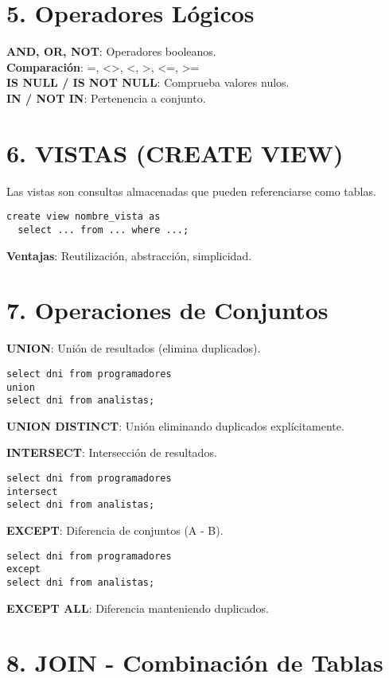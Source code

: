 \documentclass[10pt,a4paper,twocolumn]{article}
\begin{document}
\section*{5. Operadores Lógicos}

\textbf{AND, OR, NOT}: Operadores booleanos.\\
\textbf{Comparación}: =, <>, <, >, <=, >=\\
\textbf{IS NULL / IS NOT NULL}: Comprueba valores nulos.\\
\textbf{IN / NOT IN}: Pertenencia a conjunto.

\section*{6. VISTAS (CREATE VIEW)}

Las vistas son consultas almacenadas que pueden referenciarse como tablas.

\begin{lstlisting}
create view nombre_vista as
  select ... from ... where ...;
\end{lstlisting}

\textbf{Ventajas}: Reutilización, abstracción, simplicidad.

\section*{7. Operaciones de Conjuntos}

\textbf{UNION}: Unión de resultados (elimina duplicados).
\begin{lstlisting}
select dni from programadores
union
select dni from analistas;
\end{lstlisting}

\textbf{UNION DISTINCT}: Unión eliminando duplicados explícitamente.

\textbf{INTERSECT}: Intersección de resultados.
\begin{lstlisting}
select dni from programadores
intersect
select dni from analistas;
\end{lstlisting}

\textbf{EXCEPT}: Diferencia de conjuntos (A - B).
\begin{lstlisting}
select dni from programadores
except
select dni from analistas;
\end{lstlisting}

\textbf{EXCEPT ALL}: Diferencia manteniendo duplicados.

\section*{8. JOIN - Combinación de Tablas}
\end{document}
